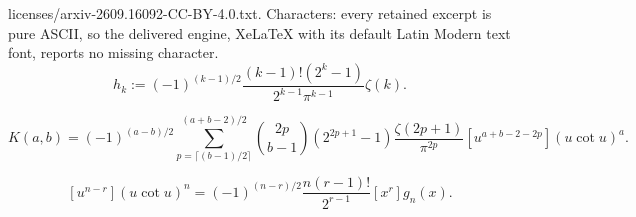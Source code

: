 \documentclass[10pt,a4paper]{amsart}
\begin{document}
licenses/arxiv-2609.16092-CC-BY-4.0.txt. Characters: every retained excerpt is pure ASCII, so the delivered engine, XeLaTeX with its default Latin Modern text font, reports no missing character.
\begin{equation}
\label{eq:hk-definition}
 h_k
 :=(-1)^{(k-1)/2}
 \frac{(k-1)!(2^k-1)}{2^{k-1}\pi^{k-1}}\zeta(k).
\end{equation}

\begin{equation}
\label{eq:talla-ab}
\boxed{
K(a,b)
=
(-1)^{(a-b)/2}
\sum_{p=\lceil(b-1)/2\rceil}^{(a+b-2)/2}
\binom{2p}{b-1}(2^{2p+1}-1)
\frac{\zeta(2p+1)}{\pi^{2p}}
[u^{a+b-2-2p}](u\cot u)^a.
}
\end{equation}

\begin{equation}
\label{eq:main-bridge}
\boxed{
 [u^{n-r}](u\cot u)^n
 =(-1)^{(n-r)/2}
 \frac{n(r-1)!}{2^{r-1}}
 [x^r]g_n(x).
}
\end{equation}

\end{document}
